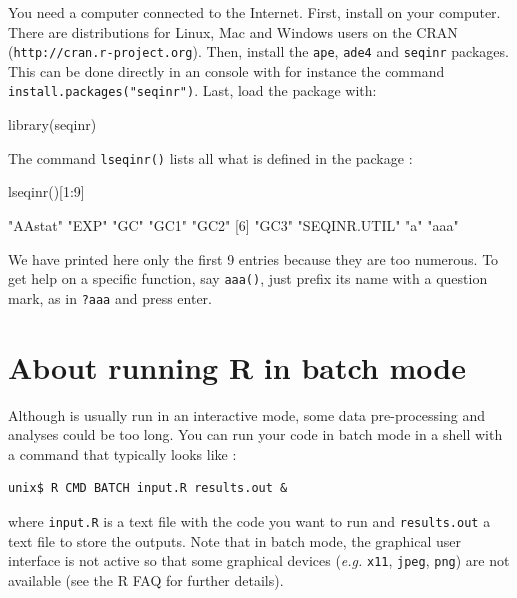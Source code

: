 \documentclass{article}
\begin{document}
You need a computer connected to the Internet. First, install \Rlogo{} on your computer.
There are distributions for Linux, Mac and Windows users
on the CRAN (\texttt{http://cran.r-project.org}). Then, install the \texttt{ape}, 
\texttt{ade4} and \texttt{seqinr} packages. This can be done directly in an \Rlogo{} console
with for instance the command \texttt{install.packages("seqinr")}. 
Last, load the \seqinr{} package with:

\begin{Schunk}
\begin{Sinput}
library(seqinr)
\end{Sinput}
\end{Schunk}

The command \texttt{lseqinr()} lists all what is defined in the package \seqinr{}:

\begin{Schunk}
\begin{Sinput}
 lseqinr()[1:9]
\end{Sinput}
\begin{Soutput}
[1] "AAstat"      "EXP"         "GC"          "GC1"         "GC2"        
[6] "GC3"         "SEQINR.UTIL" "a"           "aaa"        
\end{Soutput}
\end{Schunk}

We have printed here only the first 9 entries because they are too numerous.
To get help on a specific function, say \texttt{aaa()}, just prefix its name
with a question mark, as in \texttt{?aaa} and press enter.

\section{About running R in batch mode}

Although \Rlogo{} is usually run in an interactive mode, some data pre-processing 
and analyses could be too long. You can run your \Rlogo{} code in batch mode
in a shell with a command that typically looks like :

\begin{verbatim}
unix$ R CMD BATCH input.R results.out &
\end{verbatim}

where \texttt{input.R} is a text file with the \Rlogo{} code you want to run and
\texttt{results.out} a text file to store the outputs. Note that in batch mode,
the graphical user interface is not active so that some graphical devices 
(\textit{e.g.} \texttt{x11}, \texttt{jpeg}, \texttt{png}) are not
available (see the R FAQ \cite{RFAQ} for further details).
\end{document}
